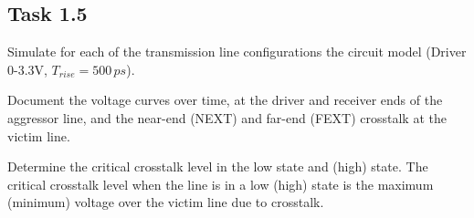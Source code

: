 \documentclass[../main.tex]{subfiles}
\begin{document}
\solution

\subsection{Task 1.5}

Simulate for each of the transmission line configurations the circuit model (Driver 0-3.3V, $T_{rise} = 500\,\si{ps}$).

\vspace{10pt}
Document the voltage curves over time, at the driver and receiver ends of the aggressor line, and the near-end (NEXT) and far-end (FEXT) crosstalk at the victim line.

\vspace{10pt}
Determine the critical crosstalk level in the low state and (high) state. The critical crosstalk level when the line is in a low (high) state is the maximum (minimum) voltage over the victim line due to crosstalk.

\solution
\end{document}
